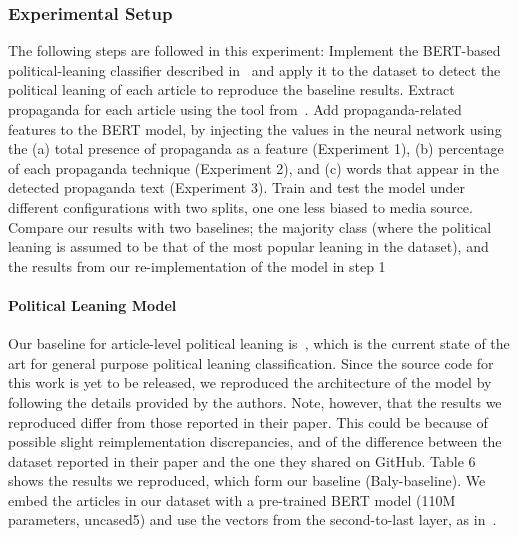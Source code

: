 \subsubsection{Experimental Setup}

The following steps are followed in this experiment:
 Implement the BERT-based political-leaning classifier described in~\citet{baly2020we} and apply it to the dataset to detect the political leaning of each article to reproduce the baseline results.
 Extract propaganda for each article using the tool from~\citet{da2019fine}.
Add propaganda-related features to the BERT model, by injecting the values in the neural network using the (a) total presence of propaganda as a feature (Experiment 1), (b) percentage of each propaganda technique (Experiment 2), and (c) words that appear in the detected propaganda text (Experiment 3).
Train and test the model under different configurations with two splits, one   one less biased to media source.
Compare our results with two baselines; the majority class (where the political leaning is assumed to be that of the most popular leaning in the dataset), and the results from our re-implementation of the model in step 1

\paragraph{Political Leaning Model}
Our baseline for article-level political leaning is~\citet{baly2020we}, which is the current state of the art for general purpose political leaning classification. Since the source code for this work is yet to be released, we reproduced the architecture of the model by following the details provided by the authors. Note, however, that the results we reproduced differ from those reported in their paper. This could be because of possible slight reimplementation discrepancies, and of the difference between the dataset reported in their paper and the one they shared on GitHub. Table 6 shows the results we reproduced, which form our baseline (Baly-baseline).
We embed the articles in our dataset with a pre-trained BERT model (110M parameters, uncased5) and use the vectors from the second-to-last layer, as in~\citet{baly2020we}.


